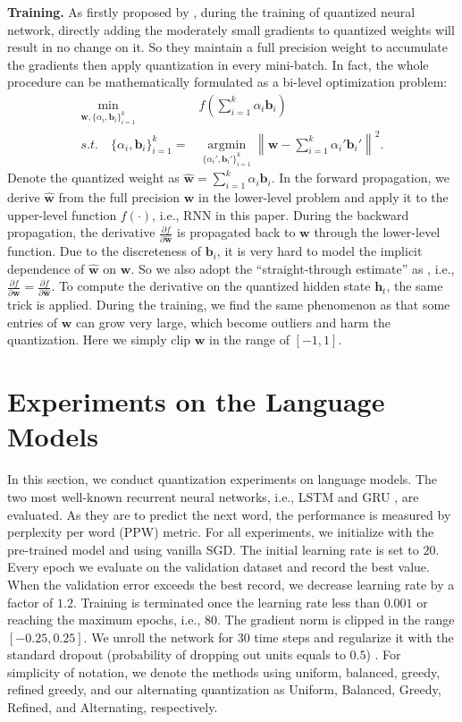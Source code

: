 \documentclass{article} %
\newcommand{\w}{\mathbf{w}}
\renewcommand{\b}{\mathbf{b}}
\newcommand{\<}{\left\langle}
\renewcommand{\>}{\right\rangle}
\begin{document}
\textbf{Training.} As firstly proposed by \citet{binaryconnect}, during the training of quantized neural network, directly adding the moderately small gradients to quantized weights will result in no change on it. So they maintain a full precision weight to accumulate the gradients then apply quantization in every mini-batch.  In fact,  the whole procedure can be mathematically formulated as a bi-level optimization \citep{bilevelreview} problem: 
\begin{equation}
\begin{split}
\min_{\w, \{\alpha_i, \b_i \}_{i=1}^k } \ & f\left(\sum_{i=1}^{k} \alpha_i \b_i\right)\\
s.t. \quad  \{\alpha_i, \b_i \}_{i=1}^k = &\mathop{\arg\min}\limits_{\{ \alpha_i', \b_i' \}_{i=1}^k }  \left\|\w -  \sum_{i=1}^{k} \alpha_i' \b_i' \right\|^2. 
\end{split}
\end{equation}
Denote the quantized weight as $\hat{\w} = \sum_{i=1}^{k} \alpha_i \b_i$.  
In the forward propagation, we derive $\hat{\w}$ from the full precision $\w$ in the lower-level problem  and  apply it to the upper-level function $f(\cdot)$, i.e., RNN in this paper. During the backward propagation, the derivative $\frac{\partial f}{\partial \hat{\w}}$  is propagated back to $\w$  through the lower-level function. Due to the discreteness of $\b_i$,  it is very hard to model the implicit dependence of $\hat{\w}$ on $\w$. So we also adopt the ``straight-through estimate'' as \citep{binaryconnect}, i.e., $\frac{\partial f}{\partial \w} = \frac{\partial f}{\partial \hat{\w}}$. To compute the derivative on the quantized hidden state $\mathbf{h}_t$, the same trick is applied.  During the training, we find the same phenomenon as \citet{qnn} that some entries of $\w$ can grow very large, which become outliers and harm the quantization. Here we simply clip $\w$ in the range of $[-1, 1]$.  
 
\section{Experiments on the Language Models}
In this section, we conduct quantization experiments on language models. The two most well-known recurrent neural networks, i.e., LSTM \citep{lstm} and GRU  \citep{gru}, are evaluated. As they are to predict the next word, the performance is measured by perplexity per word (PPW) metric.  For all experiments, we initialize with the pre-trained model and using vanilla SGD. The initial learning rate is set to $20$. Every epoch we evaluate on the validation dataset and record the best value. When the validation error exceeds the best record, we decrease learning rate by a factor of $1.2$. Training is terminated once the learning rate less than $0.001$ or reaching the maximum epochs, i.e., $80$.   The gradient norm is clipped in the range $[-0.25, 0.25]$.  We unroll the network for $30$ time steps and regularize it with the standard dropout (probability of dropping out units equals to $0.5$) \citep{dropoutrnn}. For simplicity of notation, we denote the methods using uniform, balanced, greedy, refined greedy, and our alternating quantization as Uniform, Balanced, Greedy, Refined, and Alternating, respectively.    
 
\end{document}
